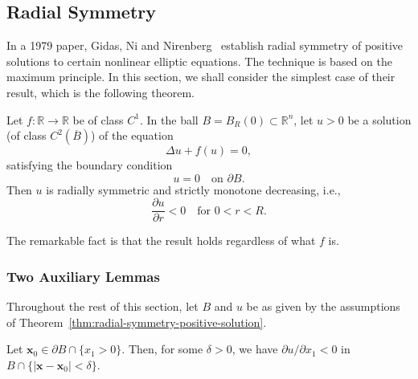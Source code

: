 \subsection{Radial Symmetry}\label{sec:radial-symmetry}

In a 1979 paper, Gidas, Ni and Nirenberg~\cite{GNN} establish radial symmetry of positive solutions to certain nonlinear elliptic equations. The technique is based on the maximum principle. In this section, we shall consider the simplest case of their result, which is the following theorem.

\begin{Theorem}
\label{thm:radial-symmetry-positive-solution}
Let $f:\mathbb{R}\to\mathbb{R}$ be of class $C^1$. In the ball $B=B_R(0)\subset\mathbb{R}^n$, let $u>0$ be a solution (of class $C^2(\overline B)$) of the equation
\begin{equation}\label{eq:radial-symmetry-semilinear-equation}
\Delta u+f(u)=0,
\end{equation}
satisfying the boundary condition
\begin{equation}\label{eq:radial-symmetry-zero-boundary}
u=0\quad\text{on }\partial B.
\end{equation}
Then $u$ is radially symmetric and strictly monotone decreasing, i.e.,
\begin{equation}\label{eq:radial-symmetry-strict-decrease}
\dfrac{\partial u}{\partial r}<0\quad\text{for }0<r<R.
\end{equation}

\end{Theorem}

The remarkable fact is that the result holds regardless of what $f$ is.

\subsubsection{Two Auxiliary Lemmas}\label{subsec:radial-auxiliary-lemmas}

Throughout the rest of this section, let $B$ and $u$ be as given by the assumptions of Theorem~\ref{thm:radial-symmetry-positive-solution}.

\begin{Lemma}
\label{lem:radial-boundary-directional-derivative}
Let $\bm{x}_0\in\partial B\cap\{x_1>0\}$. Then, for some $\delta>0$, we have $\partial u/\partial x_1<0$ in $B\cap\{|\bm{x}-\bm{x}_0|<\delta\}$.
\end{Lemma}

